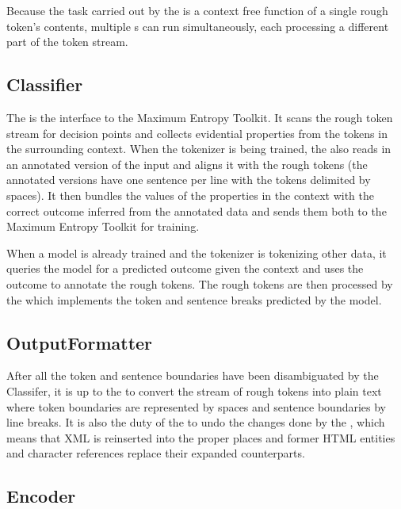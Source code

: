 Because the task carried out by the  is a context free
function of a single rough token's contents, multiple s
can run simultaneously, each processing a different part of the token stream.

\subsection{Classifier}
\label{ssec:impl-overview-classifier}

The  is the interface to the Maximum Entropy Toolkit. It
scans the rough token stream for decision points and collects evidential
properties from the tokens in the surrounding context. When the tokenizer is
being trained, the  also reads in an annotated version of the
input and aligns it with the rough tokens (the annotated versions have one
sentence per line with the tokens delimited by spaces). It then bundles the
values of the properties in the context with the correct outcome inferred from
the annotated data and sends them both to the Maximum Entropy Toolkit for
training.

When a model is already trained and the tokenizer is tokenizing other data, it
queries the model for a predicted outcome given the context and uses the
outcome to annotate the rough tokens. The rough tokens are then processed by
the  which implements the token and sentence breaks
predicted by the model.

\subsection{OutputFormatter}
\label{ssec:impl-overview-outputformatter}

After all the token and sentence boundaries have been disambiguated by the
Classifer, it is up to the  to convert the stream of
rough tokens into plain text where token boundaries are represented by spaces
and sentence boundaries by line breaks. It is also the duty of the
 to undo the changes done by the ,
which means that XML is reinserted into the proper places and former HTML
entities and character references replace their expanded counterparts.

\subsection{Encoder}
\label{ssec:impl-overview-encoder}


